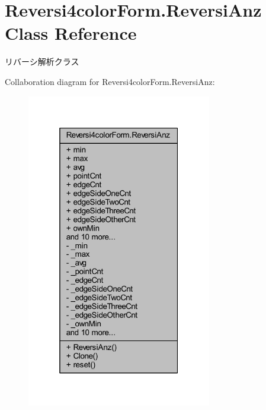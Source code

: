 \hypertarget{class_reversi4color_form_1_1_reversi_anz}{}\section{Reversi4color\+Form.\+Reversi\+Anz Class Reference}
\label{class_reversi4color_form_1_1_reversi_anz}


リバーシ解析クラス  




Collaboration diagram for Reversi4color\+Form.\+Reversi\+Anz\+:
\nopagebreak
\begin{figure}[H]
\begin{center}
\leavevmode
\includegraphics[width=229pt]{class_reversi4color_form_1_1_reversi_anz__coll__graph}
\end{center}
\end{figure}
